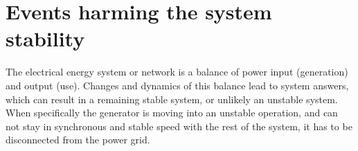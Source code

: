 
\section{Events harming the system stability}

The electrical energy system or network is a balance of power input (generation) and output (use). Changes and dynamics of this balance lead to system answers, which can result in a remaining stable system, or unlikely an unstable system. When specifically the generator is moving into an unstable operation, and can not stay in synchronous and stable speed with the rest of the system, it has to be disconnected from the power grid.

